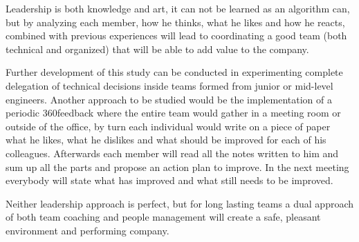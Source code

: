 Leadership is both knowledge and art, it can not be learned as an algorithm can, but by analyzing each member, how he thinks, what he likes and how he reacts, combined with previous experiences will lead to coordinating a good team (both technical and organized) that will be able to add value to the company.

Further development of this study can be conducted in experimenting complete delegation of technical decisions inside teams formed from junior or mid-level engineers. Another approach to be studied would be the implementation of a periodic 360\textdegree feedback where the entire team would gather in a meeting room or outside of the office, by turn each individual would  write on a piece of paper what he likes, what he dislikes and what should be improved for each of his colleagues. Afterwards each member will read all the notes written to him and sum up all the parts and propose an action plan to improve. In the next meeting everybody will state what has improved and what still needs to be improved.

Neither leadership approach is perfect, but for long lasting teams a dual approach of both team coaching and people management will create a safe, pleasant environment and performing company.